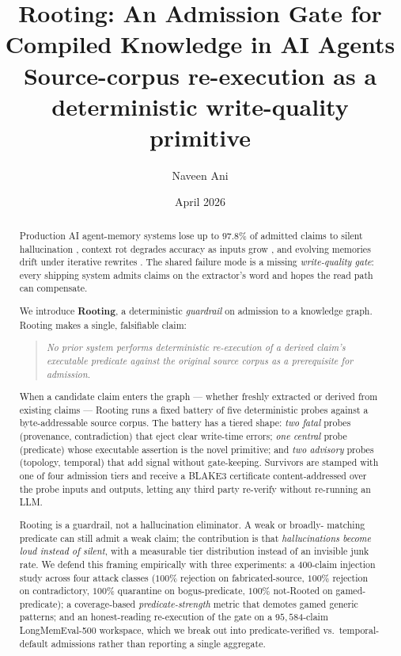 \documentclass[10pt,a4paper]{article}
\title{\textbf{Rooting: An Admission Gate for Compiled Knowledge in AI Agents} \\[4pt]
\large Source-corpus re-execution as a deterministic write-quality primitive}
\author[1]{Naveen Ani}
\affil[1]{\texttt{itsnaveenani@gmail.com}}
\date{April 2026}
\begin{document}
\maketitle

\begin{abstract}
Production AI agent-memory systems lose up to $97.8\%$ of admitted claims to
silent hallucination \cite{mem0junk}, context rot degrades accuracy as inputs
grow \cite{chromarot2025}, and evolving memories drift under iterative
rewrites \cite{evolvingmemory2026}. The shared failure mode is a missing
\emph{write-quality gate}: every shipping system admits claims on the
extractor's word and hopes the read path can compensate.

We introduce \textbf{Rooting}, a deterministic \emph{guardrail} on admission
to a knowledge graph. Rooting makes a single, falsifiable claim:

\begin{quote}\small\itshape
  No prior system performs deterministic re-execution of a derived claim's
  executable predicate against the original source corpus as a prerequisite
  for admission.
\end{quote}

When a candidate claim enters the graph --- whether freshly extracted or
derived from existing claims --- Rooting runs a fixed battery of five
deterministic probes against a byte-addressable source corpus. The battery
has a tiered shape: \emph{two fatal} probes (provenance, contradiction) that
eject clear write-time errors; \emph{one central} probe (predicate) whose
executable assertion is the novel primitive; and \emph{two advisory} probes
(topology, temporal) that add signal without gate-keeping. Survivors are
stamped with one of four admission tiers and receive a BLAKE3 certificate
content-addressed over the probe inputs and outputs, letting any third
party re-verify without re-running an LLM.

Rooting is a guardrail, not a hallucination eliminator. A weak or broadly-
matching predicate can still admit a weak claim; the contribution is that
\emph{hallucinations become loud instead of silent}, with a measurable
tier distribution instead of an invisible junk rate. We defend this
framing empirically with three experiments: a $400$-claim injection study
across four attack classes ($100\%$ rejection on fabricated-source, $100\%$
rejection on contradictory, $100\%$ quarantine on bogus-predicate, $100\%$
not-Rooted on gamed-predicate); a coverage-based \emph{predicate-strength}
metric that demotes gamed generic patterns; and an honest-reading
re-execution of the gate on a $95{,}584$-claim LongMemEval-500 workspace,
which we break out into predicate-verified vs.\ temporal-default admissions
rather than reporting a single aggregate.


\end{abstract}
\end{document}
